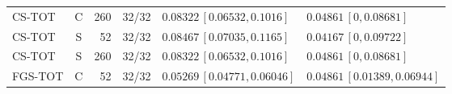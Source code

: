 \begin{longtable}{lcrcp{44mm}p{44mm}}
CS-TOT & C & 260 & 32/32 & \(0.08322\,[0.06532,0.1016]\) & \(0.04861\,[0,0.08681]\)\\
CS-TOT & S & 52 & 32/32 & \(0.08467\,[0.07035,0.1165]\) & \(0.04167\,[0,0.09722]\)\\
CS-TOT & S & 260 & 32/32 & \(0.08322\,[0.06532,0.1016]\) & \(0.04861\,[0,0.08681]\)\\
FGS-TOT & C & 52 & 32/32 & \(0.05269\,[0.04771,0.06046]\) & \(0.04861\,[0.01389,0.06944]\)\\

\end{longtable}
